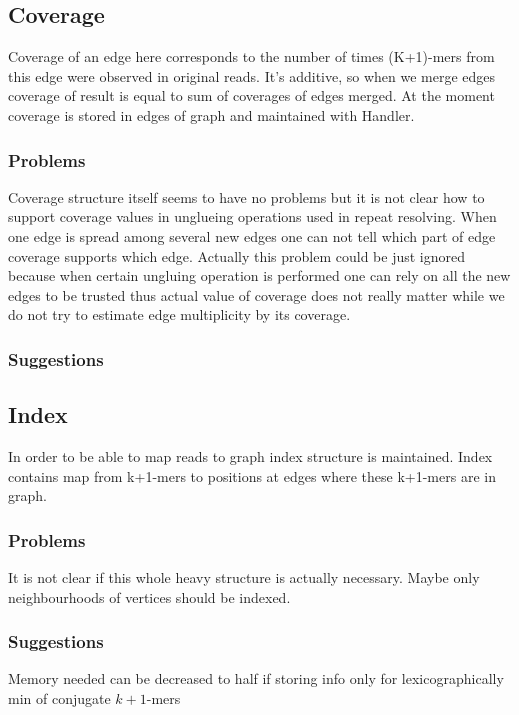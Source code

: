 \documentclass[12pt]{article}
\begin{document}
\subsection{Coverage}

Coverage of an edge here corresponds to the number of times (K+1)-mers from this edge were observed in original reads. It's additive, so when we merge edges coverage of result is equal to sum of coverages of edges merged. At the moment coverage is stored in edges of graph and maintained with Handler.

\subsubsection{Problems}

Coverage structure itself seems to have no problems but it is not clear how to support coverage values in unglueing operations used in repeat resolving. When one edge is spread among several new edges one can not tell which part of edge coverage supports which edge. Actually this problem could be just ignored because when certain ungluing operation is performed one can rely on all the new edges to be trusted thus actual value of coverage does not really matter while we do not try to estimate edge multiplicity by its coverage.

\subsubsection{Suggestions}

\subsection{Index}

In order to be able to map reads to graph index structure is maintained. Index contains map from k+1-mers to positions at edges where these k+1-mers are in graph.

\subsubsection{Problems}

It is not clear if this whole heavy structure is actually necessary. Maybe only neighbourhoods of vertices should be indexed.


\subsubsection{Suggestions}
Memory needed can be decreased to half if storing info only for lexicographically min of conjugate $k+1$-mers
\end{document}
